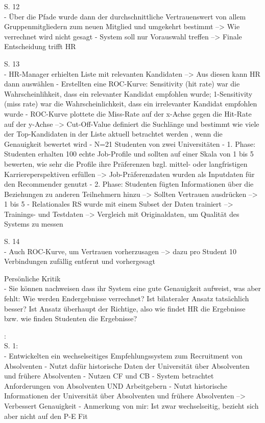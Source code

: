 S. 12\\
- Über die Pfade wurde dann der durchschnittliche Vertrauenswert von allem Gruppenmitgliedern zum neuen Mitglied und umgekehrt bestimmt --> Wie verrechnet wird nicht gesagt
- System soll nur Vorauswahl treffen --> Finale Entscheidung trifft HR

S. 13\\
- HR-Manager erhielten Liste mit relevanten Kandidaten --> Aus diesen kann HR dann auswählen
- Erstellten eine ROC-Kurve: Sensitivity (hit rate) war die Wahrscheinlihkeit, dass ein relevanter Kandidat empfohlen wurde; 1-Sensitivity (miss rate) war die Wahrscheinlichkeit, dass ein irrelevanter Kandidat empfohlen wurde
- ROC-Kurve plottete die Miss-Rate auf der x-Achse gegen die Hit-Rate auf der y-Achse --> Cut-Off-Value definiert die Suchlänge und bestimmt wie viele der Top-Kandidaten in der Liste aktuell betrachtet werden , wenn die Genauigkeit bewertet wird
- N=21 Studenten von zwei Universitäten
- 1. Phase: Studenten erhalten 100 echte Job-Profile und sollten auf einer Skala von 1 bis 5 bewerten, wie sehr die Profile ihre Präferenzen bzgl. mittel- oder langfristigen Karriereperspektiven erfüllen --> Job-Präferenzdaten wurden als Inputdaten für den Recommender genutzt
- 2. Phase: Studenten fügten Informationen über die Beziehungen zu anderen Teilnehmern hinzu --> Sollten Vertrauen ausdrücken --> 1 bis 5
- Relationales RS wurde mit einem Subset der Daten trainiert --> Trainings- und Testdaten --> Vergleich mit Originaldaten, um Qualität des Systems zu messen

S. 14\\
- Auch ROC-Kurve, um Vertrauen vorherzusagen --> dazu pro Student 10 Verbindungen zufällig entfernt und vorhergesagt

Persönliche Kritik\\
- Sie können nachweisen dass ihr System eine gute Genauigkeit aufweist, was aber fehlt: Wie werden Endergebnisse verrechnet? Ist bilateraler Ansatz tatsächlich besser? Ist Ansatz überhaupt der Richtige, also wie findet HR die Ergebnisse bzw. wie finden Studenten die Ergebnisse?






\textcite{ding:2016}:\\
S. 1:\\
- Entwickelten ein wechselseitiges Empfehlungssystem zum Recruitment von Absolventen
- Nutzt dafür historische Daten der Universität über Absolventen und frühere Absolventen
- Nutzen CF und CB
- System betrachtet Anforderungen von Absolventen UND Arbeitgebern
- Nutzt historische Informationen der Universität über Absolventen und frühere Absolventen --> Verbessert Genauigkeit
- Anmerkung von mir: Ist zwar wechselseitig, bezieht sich aber nicht auf den P-E Fit


